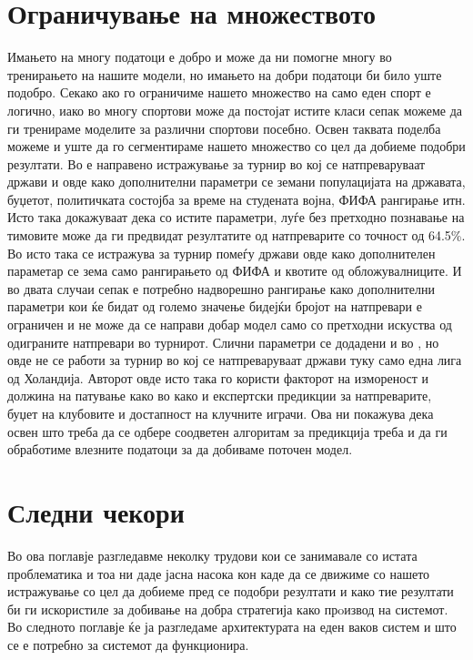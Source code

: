 \section{Ограничување на множеството}
Имањето на многу податоци е добро и може да ни помогне многу во тренирањето на нашите модели, но имањето на добри податоци би било уште подобро. Секако ако го ограничиме нашето множество на само еден спорт е логично, иако во многу спортови може да постојат истите класи сепак можеме да ги тренираме моделите за различни спортови посебно. Освен таквата поделба можеме и уште да го сегментираме нашето множество со цел да добиеме подобри резултати. 
Во \cite{pachur2007forecasting} е направено истражување за турнир во кој се натпреваруваат држави и овде како дополнителни параметри се земани популацијата на државата, буџетот, политичката состојба за време на студената војна, ФИФА рангирање итн. Исто така докажуваат дека со истите параметри, луѓе без претходно познавање на тимовите може да ги предвидат резултатите од натпреварите со точност од 64.5\%. Во \cite{leitner2010forecasting} исто така се истражува за турнир помеѓу држави овде како дополнителен параметар се зема само рангирањето од ФИФА и квотите од обложувалниците. И во двата случаи сепак е потребно надворешно рангирање како дополнителни параметри кои ќе бидат од големо значење бидејќи бројот на натпревари е ограничен и не може да се направи добар модел само со претходни искуства од одиграните натпревари во турнирот. 
Слични параметри се додадени и во \cite{tax2015predicting}, но овде не се работи за турнир во кој се натпреваруваат држави туку само една лига од Холандија. Авторот овде исто така го користи факторот на измореност и должина на патување како во \cite{zdravevski2010system} како и експертски предикции за натпреварите, буџет на клубовите и достапност на клучните играчи. Ова ни покажува дека освен што треба да се одбере соодветен алгоритам за предикција треба и да ги обработиме влезните податоци за да добиваме поточен модел. 
\section{Следни чекори}
Во ова поглавје разгледавме неколку трудови кои се занимавале со истата проблематика и тоа ни даде јасна насока кон каде да се движиме со нашето истражување со цел да добиеме пред се подобри резултати и како тие резултати би ги искористиле за добивање на добра стратегија како прoизвод на системот. Во следното поглавје ќе ја разгледаме архитектурата на еден ваков систем и што се е потребно за системот да функционира. 

